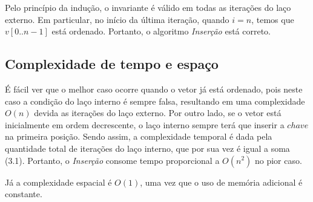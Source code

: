 Pelo princípio da indução, o invariante é válido em todas as iterações do laço externo. Em particular, no início da última iteração, quando $i = n$, temos que $v[0..n-1]$ está ordenado. Portanto, o algoritmo \textit{Inserção} está correto.

\subsection{Complexidade de tempo e espaço}
É fácil ver que o melhor caso ocorre quando o vetor já está ordenado, pois neste caso a condição do laço interno é sempre falsa, resultando em uma complexidade $O(n)$ devida as iterações do laço externo. Por outro lado, se o vetor está inicialmente em ordem decrescente, o laço interno sempre terá que inserir a $chave$ na primeira posição. Sendo assim, a complexidade temporal é dada pela quantidade total de iterações do laço interno, que por sua vez é igual a soma (3.1). Portanto, o \textit{Inserção} consome tempo proporcional a $O(n^2)$ no pior caso.

Já a complexidade espacial é $O(1)$, uma vez que o uso de memória adicional é constante.